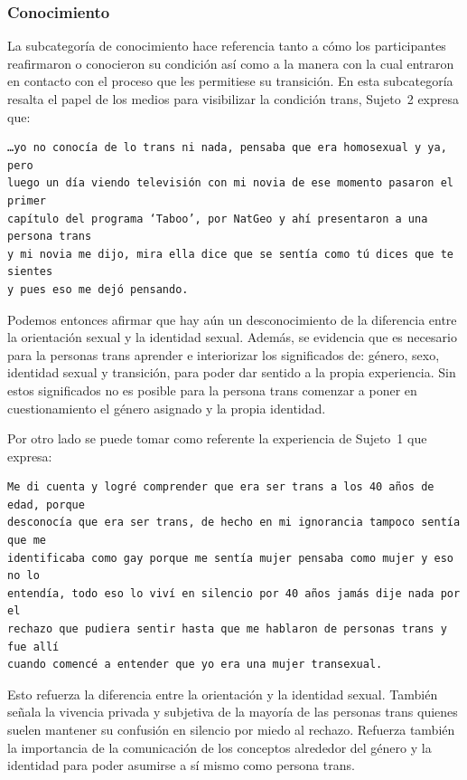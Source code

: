 \subsubsection{Conocimiento}

La subcategoría de conocimiento hace referencia tanto a cómo los participantes
reafirmaron o conocieron su condición así como a la manera con la cual entraron
en contacto con el proceso que les permitiese su transición. En esta
subcategoría resalta el papel de los medios para visibilizar la
condición trans, Sujeto~2 expresa que:

\begin{verbatim}
…yo no conocía de lo trans ni nada, pensaba que era homosexual y ya, pero
luego un día viendo televisión con mi novia de ese momento pasaron el primer
capítulo del programa ‘Taboo’, por NatGeo y ahí presentaron a una persona trans
y mi novia me dijo, mira ella dice que se sentía como tú dices que te sientes
y pues eso me dejó pensando.
\end{verbatim}

Podemos entonces afirmar que hay aún un desconocimiento de la diferencia entre
la orientación sexual y la identidad sexual. Además, se evidencia que es
necesario para la personas trans aprender e interiorizar los significados de:
género, sexo, identidad sexual y transición, para poder dar sentido a la propia
experiencia. Sin estos significados no es posible para la persona trans comenzar
a poner en cuestionamiento el género asignado y la propia identidad.

Por otro lado se puede tomar como referente la experiencia de Sujeto~1 que
expresa:

\begin{verbatim}
Me di cuenta y logré comprender que era ser trans a los 40 años de edad, porque
desconocía que era ser trans, de hecho en mi ignorancia tampoco sentía que me
identificaba como gay porque me sentía mujer pensaba como mujer y eso no lo
entendía, todo eso lo viví en silencio por 40 años jamás dije nada por el
rechazo que pudiera sentir hasta que me hablaron de personas trans y fue allí
cuando comencé a entender que yo era una mujer transexual.
\end{verbatim}

Esto refuerza la diferencia entre la orientación y la identidad sexual. También
señala la vivencia privada y subjetiva de la mayoría de las personas trans
quienes suelen mantener su confusión en silencio por miedo al rechazo. Refuerza
también la importancia de la comunicación de los conceptos alrededor del género
y la identidad para poder asumirse a sí mismo como persona trans.

